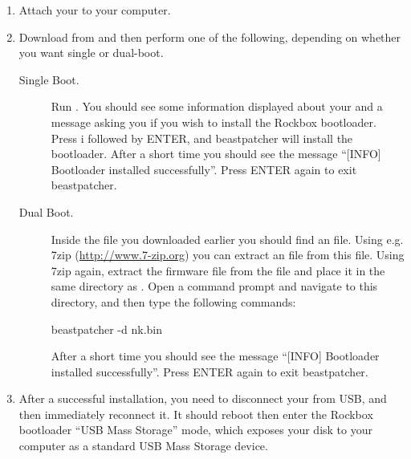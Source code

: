 \begin{enumerate}

\item Attach your \dap{} to your computer.

\item Download  from
and then perform one of the following, depending on whether you want single
or dual-boot.

\begin{description}
\item [Single Boot.] Run . You should see some
information displayed about
your \dap{} and a message asking you if you wish to install the Rockbox
bootloader. Press i followed by ENTER, and beastpatcher will
install the bootloader. After a short time you should see the message
``[INFO] Bootloader installed successfully''. Press ENTER again to exit
beastpatcher.

\item [Dual Boot.] Inside the  file you downloaded earlier
you should find an  file.  Using e.g. 7zip
(\url{http://www.7-zip.org}) you can extract an  file from this
 file.  Using 7zip again, extract the \playerman{} firmware file
 from the  file and place it in the same
directory as .  Open a command prompt and navigate
to this directory, and then type the following commands:

\begin{code} 
    beastpatcher -d nk.bin
\end{code}

After a short time you should see the message
``[INFO] Bootloader installed successfully''. Press ENTER again to exit
beastpatcher.
\end{description}

\item After a successful installation, you need to disconnect your \dap{} from
USB, and then immediately reconnect it. It should reboot then enter the Rockbox
bootloader ``USB Mass Storage'' mode, which exposes your \daps{} disk to your
computer as a standard USB Mass Storage device.
\end{enumerate}

